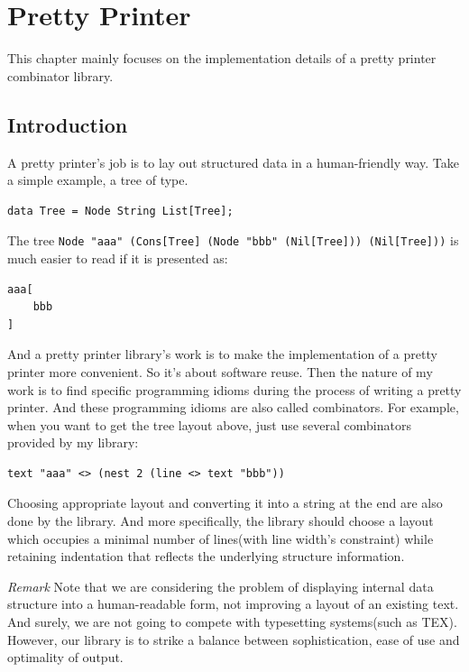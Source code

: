 \chapter{Pretty Printer}
This chapter mainly focuses on the implementation details of a pretty printer combinator library.

\section{Introduction}

A pretty printer's job is to lay out structured data in a human-friendly way. Take a simple example, a tree of type.

\begin{lstlisting}
data Tree = Node String List[Tree];
\end{lstlisting}

The tree \texttt{Node "aaa" (Cons[Tree] (Node "bbb" (Nil[Tree])) (Nil[Tree]))} is much easier to read if it is presented as:

\begin{lstlisting}
aaa[
    bbb
]
\end{lstlisting}

And a pretty printer library's work is to make the implementation of a pretty printer more convenient. So it's about software reuse. Then the nature of my work is to find specific programming idioms during the process of writing a pretty printer. And these programming idioms are also called combinators. For example, when you want to get the tree layout above, just use several combinators provided by my library:

\begin{lstlisting}
text "aaa" <> (nest 2 (line <> text "bbb"))
\end{lstlisting}

Choosing appropriate layout and converting it into a string at the end are also done by the library. And more specifically, the library should choose a layout which occupies a minimal number of lines(with line width's constraint) while retaining indentation that reflects the underlying structure information.

\emph{Remark}
Note that we are considering the problem of displaying internal data structure into a human-readable form, not improving a layout of an existing text. And surely, we are not going to compete with typesetting systems(such as TEX). However, our library is to strike a balance between sophistication, ease of use and optimality of output.


